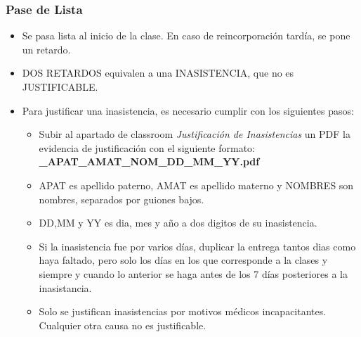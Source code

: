 \begin{frame}
\frametitle{Pase de Lista}
\begin{itemize}
\item Se pasa lista al inicio de la clase. En caso de reincorporaci\'on tard\'ia, se pone un retardo.
\item DOS RETARDOS equivalen a una INASISTENCIA, que no es JUSTIFICABLE.
\item Para justificar una inasistencia, es necesario cumplir con los siguientes pasos:
\begin{itemize}	 
\item Subir al apartado de classroom \textit{Justificación de Inasistencias} un PDF la evidencia de justificación con el siguiente formato:
\textbf{\clavegrupo\_APAT\_AMAT\_NOM\_DD\_MM\_YY.pdf} 
\item APAT es apellido paterno, AMAT es apellido materno y NOMBRES son nombres, separados por guiones bajos. 
\item DD,MM y YY es dia, mes y año a dos digitos de su inasistencia. 
\item Si la inasistencia fue por varios días, duplicar la entrega tantos dias como haya faltado, pero solo los días en los que corresponde a la clases y siempre y cuando lo anterior se haga antes de los 7 días posteriores a la inasistancia.
\item Solo se justifican inasistencias por motivos médicos incapacitantes. Cualquier otra causa no es justificable.
\end{itemize}
\end{itemize}
\end{frame}


